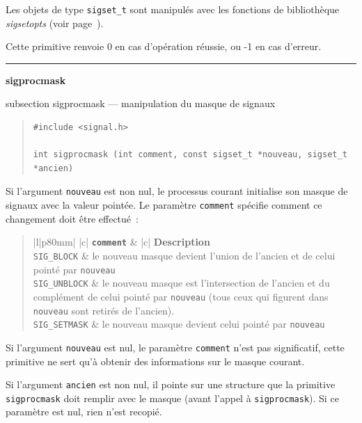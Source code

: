 \documentclass [twoside] {report}
\newcommand {\primitive} [1]
    {
	\phantomsection
	{\large \textbf {#1}}
	\addcontentsline {toc} {subsection} {#1}
    }
\newcommand {\separation}
    {
	\vspace {5mm}
	\nopagebreak
	\hrule
    }
\begin{document}
Les objets de type \texttt {sigset\_t} sont manipulés avec les fonctions de
bibliothèque \emph {sigsetopts} (voir page~\pageref {sigsetopts}).

Cette primitive renvoie 0 en cas d'opération réussie, ou -1 en cas
d'erreur.



\separation
\primitive {sigprocmask} --- manipulation du masque de signaux
    \label {sigprocmask}

\begin {quote}
\begin {verbatim}
#include <signal.h>

int sigprocmask (int comment, const sigset_t *nouveau, sigset_t *ancien)
\end{verbatim}
\end {quote}

Si l'argument \texttt {nouveau} est non nul, le processus courant initialise
son masque de signaux avec la valeur pointée. Le paramètre \texttt {comment}
spécifie comment ce changement doit être effectué~:

\begin {quote}
\begin {tabular} {|l|p{80mm}|} \hline
     {|c|} {\texttt {\textbf {comment}}}
	&  {|c|} {\textbf {Description}}
	\\ \hline
    \verb:SIG_BLOCK:
	& le nouveau masque devient l'union de l'ancien et de celui pointé
	    par \texttt {nouveau}
	\\ \hline
    \verb:SIG_UNBLOCK:
	& le nouveau masque est l'intersection de l'ancien et du
	    complément de celui pointé par \texttt {nouveau} (tous ceux qui
	    figurent dans \texttt {nouveau} sont retirés de l'ancien).
	\\ \hline
    \verb:SIG_SETMASK:
	& le nouveau masque devient celui pointé par \texttt {nouveau}
	\\ \hline
\end {tabular}
\end {quote}

Si l'argument \texttt {nouveau} est nul, le paramètre \texttt {comment}
n'est pas significatif, cette primitive ne sert qu'à obtenir des
informations sur le masque courant.

Si l'argument \texttt {ancien} est non nul, il pointe sur une structure que
la primitive \texttt {sigprocmask} doit remplir avec le masque (avant
l'appel à \texttt {sigprocmask}).  Si ce paramètre est nul, rien n'est
recopié.
\end{document}
